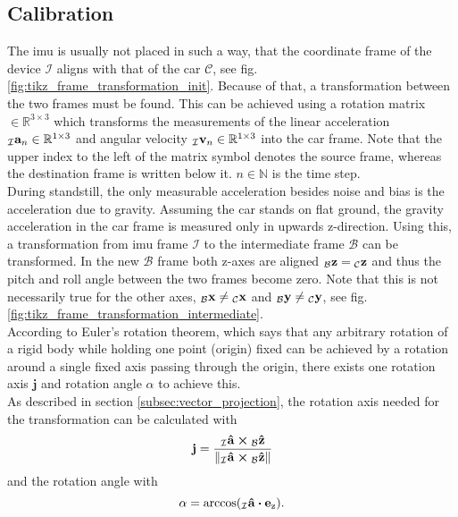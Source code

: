 \subsection{Calibration}
The \gls{imu} is usually not placed in such a way, that the coordinate frame of the device $\mathcal{I}$ aligns with that of the car $\mathcal{C}$, see fig. \ref{fig:tikz_frame_transformation_init}.
Because of that, a transformation between the two frames must be found.
This can be achieved using a rotation matrix  $\in \mathbb{R}^{3\times3}$ which transforms the measurements of the linear acceleration $\vincs{a}{I}_n \in \mathbb{R}^{1\times3}$ and angular velocity ${\vincs{v}{I}_n \in \mathbb{R}^{1\times3}}$ into the car frame.
Note that the upper index to the left of the matrix symbol denotes the source frame, whereas the destination frame is written below it.
 $n \in \mathbb{N}$ is the time step.\\
During standstill, the only measurable acceleration besides noise and bias is the acceleration due to gravity.
Assuming the car stands on flat ground, the gravity acceleration in the car frame is measured only in upwards z-direction.
Using this, a transformation from \gls{imu} frame $\mathcal{I}$ to the intermediate frame $\mathcal{B}$ can be transformed.
In the new $\mathcal{B}$ frame both z-axes are aligned $\vincs{z}{b} = \vincs{z}{c}$ and thus the pitch and roll angle between the two frames become zero.
Note that this is not necessarily true for the other axes, $\vincs{x}{b}\neq\vincs{x}{c}$ and $\vincs{y}{b}\neq\vincs{y}{c}$, see fig. \ref{fig:tikz_frame_transformation_intermediate}.\\
According to Euler's rotation theorem, which says that any arbitrary rotation of a rigid body while holding one point (origin) fixed can be achieved by a rotation around a single fixed axis passing through the origin, there exists one rotation axis $\mathbf{j}$ and rotation angle $\alpha$ to achieve this.\\
As described in section \ref{subsec:vector_projection}, the rotation axis needed for the transformation can be calculated with
\begin{equation}
    \vb{j} = \frac{\vincs{\vu{a}}{i} \cp \vincs{\vu{z}}{b}}{\norm{\vincs{\vu{a}}{i} \cp \vincs{\vu{z}}{b}}}
\end{equation}
and the rotation angle with 
\begin{equation}
    \alpha = \arccos(\vincs{\vu{a}}{i}\vdot \vb{e}_\mathrm{z}).
\end{equation}
